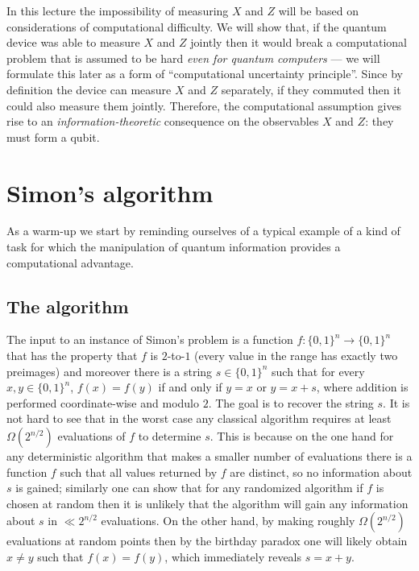 In this lecture the impossibility of measuring $X$ and $Z$ will be based on  considerations of computational difficulty. We will show that, if the quantum device was able to measure $X$ and $Z$ jointly then it would  break a computational problem that is assumed to be hard \emph{even for quantum computers} --- we will formulate this later as a form of ``computational uncertainty principle''. Since by definition the device can measure $X$ and $Z$ separately, if they commuted then it could also measure them jointly. Therefore, the computational assumption gives rise to an \emph{information-theoretic} consequence on the observables $X$ and $Z$: they must form a qubit.  

\section{Simon's algorithm}

As a warm-up we start by reminding ourselves of a typical example of a kind of task for which the manipulation of quantum information provides  a computational advantage.

\subsection{The algorithm}
\label{sec:simon-algorithm}

The input to an instance of Simon's problem is a function $f:\{0,1\}^n\to \{0,1\}^n$ that has the property that $f$ is $2$-to-$1$ (every value in the range has exactly two preimages) and moreover there is a string $s\in\{0,1\}^n$ such that for every $x,y\in\{0,1\}^n$, $f(x)=f(y)$ if and only if $y=x$ or $y=x+ s$, where addition is performed coordinate-wise and modulo $2$. The goal is to recover the string $s$. It is not hard to see that in the worst case any classical algorithm requires at least $\Omega(2^{n/2})$ evaluations of $f$ to determine $s$. This is because on the one hand for any deterministic algorithm that makes a smaller number of evaluations there is a function $f$ such that all values returned by $f$ are distinct, so no information about $s$ is gained; similarly one can show that for any randomized algorithm if $f$ is chosen at random then it is unlikely that the algorithm will gain any information about $s$ in $\ll 2^{n/2}$ evaluations. On the other hand, by making roughly $\Omega(2^{n/2})$ evaluations at random points then by the birthday paradox one will likely obtain $x\neq y$ such that $f(x)=f(y)$, which immediately reveals $s=x+ y$. 


